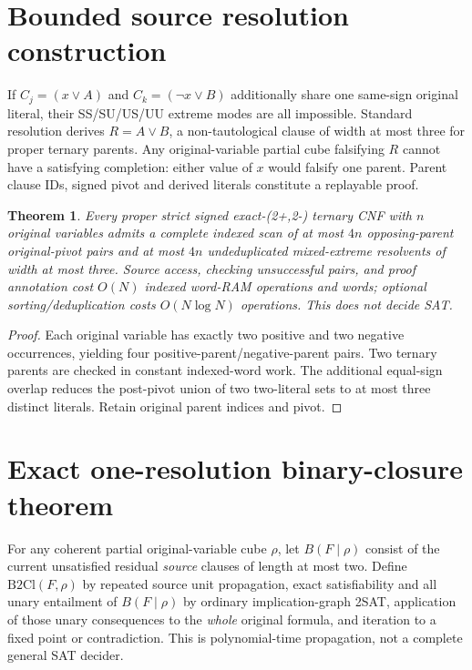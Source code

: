 \documentclass[10pt]{article}
\newtheorem{theorem}{Theorem}
\begin{document}
\section{Bounded source resolution construction}
If $C_j=(x\vee A)$ and $C_k=(\neg x\vee B)$ additionally share one same-sign original literal, their SS/SU/US/UU extreme modes are all impossible. Standard resolution derives $R=A\vee B$, a non-tautological clause of width at most three for proper ternary parents. Any original-variable partial cube falsifying $R$ cannot have a satisfying completion: either value of $x$ would falsify one parent. Parent clause IDs, signed pivot and derived literals constitute a replayable proof.
\begin{theorem}
Every proper strict signed exact-(2+,2-) ternary CNF with $n$ original variables admits a complete indexed scan of at most $4n$ opposing-parent original-pivot pairs and at most $4n$ undeduplicated mixed-extreme resolvents of width at most three. Source access, checking unsuccessful pairs, and proof annotation cost $O(N)$ indexed word-RAM operations and words; optional sorting/deduplication costs $O(N\log N)$ operations. This does not decide SAT.
\end{theorem}
\begin{proof}
Each original variable has exactly two positive and two negative occurrences, yielding four positive-parent/negative-parent pairs. Two ternary parents are checked in constant indexed-word work. The additional equal-sign overlap reduces the post-pivot union of two two-literal sets to at most three distinct literals. Retain original parent indices and pivot.
\end{proof}

\section{Exact one-resolution binary-closure theorem}
For any coherent partial original-variable cube $\rho$, let $B(F\mid\rho)$ consist of the current unsatisfied residual \emph{source} clauses of length at most two. Define $\mathrm{B2Cl}(F,\rho)$ by repeated source unit propagation, exact satisfiability and all unary entailment of $B(F\mid\rho)$ by ordinary implication-graph 2SAT, application of those unary consequences to the \emph{whole} original formula, and iteration to a fixed point or contradiction. This is polynomial-time propagation, not a complete general SAT decider.
\end{document}
